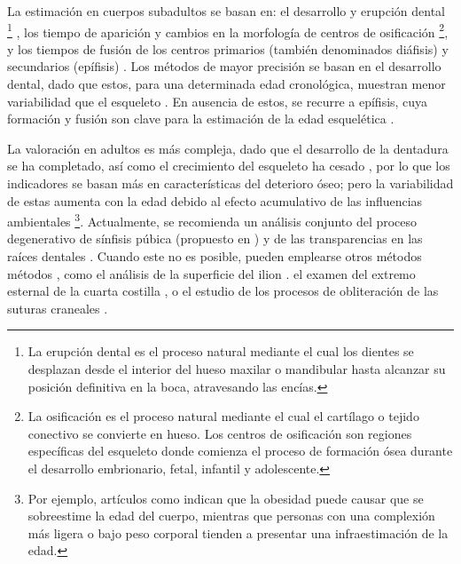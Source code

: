 La estimación en cuerpos subadultos se basan en: el desarrollo y erupción dental
\footnote{
    La erupción dental es el proceso natural mediante el cual los dientes se desplazan desde el interior del 
    hueso maxilar o mandibular hasta alcanzar su posición definitiva en la boca, atravesando las encías.
} \cite{cameriere2006}, 
los tiempo de aparición y cambios en la morfología de centros de osificación
\footnote{
    La osificación es el proceso natural mediante el cual el cartílago o tejido conectivo se convierte en 
    hueso. Los centros de osificación son regiones específicas del esqueleto donde comienza el proceso de 
    formación ósea durante el desarrollo embrionario, fetal, infantil y adolescente.
},
y los tiempos de fusión de los centros primarios (también denominados diáfisis) y secundarios (epífisis) 
\cite{scheuer2000, adserias2019}. 
Los métodos de mayor precisión se basan en el desarrollo dental, dado que estos, para una determinada
edad cronológica, muestran menor variabilidad que el esqueleto \cite{bowman1992}. En ausencia de estos, 
se recurre a epífisis, cuya formación y fusión son clave para la estimación de la edad esquelética 
\cite{adserias2019}.

La valoración en adultos es más compleja, dado que el desarrollo de la dentadura se ha completado, 
así como el crecimiento del esqueleto ha cesado \cite{byers2023}, por lo que los indicadores 
se basan más en características del deterioro óseo; pero la variabilidad de estas aumenta con la 
edad debido al efecto acumulativo de las influencias ambientales \cite{ubelaker2018, scheuer2004} 
\footnote{
    Por ejemplo, artículos como \cite{merritt2015,wescott2015} indican que la obesidad puede causar que se 
    sobreestime la edad del cuerpo, mientras que personas con una complexión más ligera o bajo peso corporal 
    tienden a presentar una infraestimación de la edad.
}. 
Actualmente, se recomienda un análisis conjunto del proceso degenerativo de sínfisis púbica (propuesto 
en \cite{brooks1990}) y de las transparencias en las raíces dentales \cite{baccino2014}. 
Cuando este no es posible, pueden emplearse otros métodos métodos \cite{garvin2012}, como
el análisis de la superficie del ilion \cite{lovejoy1985}. el examen del extremo esternal de la cuarta
costilla \cite{iscan1984}, o el estudio de los procesos de obliteración de las suturas craneales 
\cite{meindl1985}.

